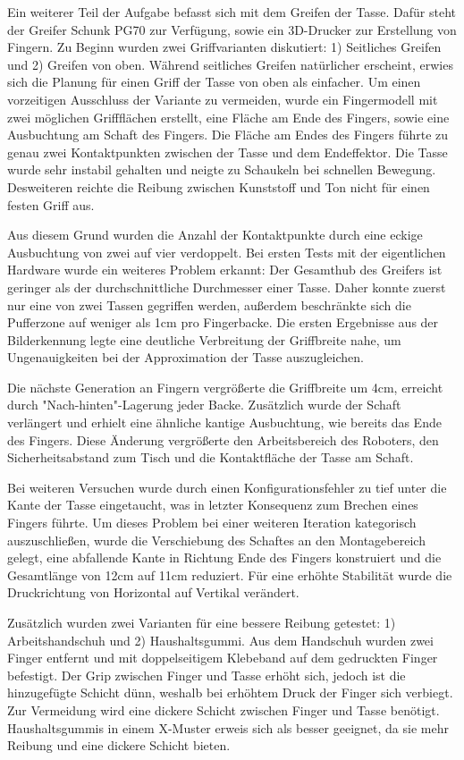 Ein weiterer Teil der Aufgabe befasst sich mit dem Greifen der Tasse. Dafür steht der Greifer Schunk PG70 zur Verfügung, sowie ein 3D-Drucker zur Erstellung von Fingern. Zu Beginn wurden zwei Griffvarianten diskutiert: 1) Seitliches Greifen und 2) Greifen von oben. Während seitliches Greifen natürlicher erscheint, erwies sich die Planung für einen Griff der Tasse von oben als einfacher. Um einen vorzeitigen Ausschluss der Variante zu vermeiden, wurde ein Fingermodell mit zwei möglichen Griffflächen erstellt, eine Fläche am Ende des Fingers, sowie eine Ausbuchtung am Schaft des Fingers. Die Fläche am Endes des Fingers führte zu genau zwei Kontaktpunkten zwischen der Tasse und dem Endeffektor. Die Tasse wurde sehr instabil gehalten und neigte zu Schaukeln bei schnellen Bewegung. Desweiteren reichte die Reibung zwischen Kunststoff und Ton nicht für einen festen Griff aus.

Aus diesem Grund wurden die Anzahl der Kontaktpunkte durch eine eckige Ausbuchtung von zwei auf vier verdoppelt. Bei ersten Tests mit der eigentlichen Hardware wurde ein weiteres Problem erkannt: Der Gesamthub des Greifers ist geringer als der durchschnittliche Durchmesser einer Tasse. Daher konnte zuerst nur eine von zwei Tassen gegriffen werden, außerdem beschränkte sich die Pufferzone auf weniger als 1cm pro Fingerbacke. Die ersten Ergebnisse aus der Bilderkennung legte eine deutliche Verbreitung der Griffbreite nahe, um Ungenauigkeiten bei der Approximation der Tasse auszugleichen.

Die nächste Generation an Fingern vergrößerte die Griffbreite um 4cm, erreicht durch "Nach-hinten"-Lagerung jeder Backe. Zusätzlich wurde der Schaft verlängert und erhielt eine ähnliche kantige Ausbuchtung, wie bereits das Ende des Fingers. Diese Änderung vergrößerte den Arbeitsbereich des Roboters, den Sicherheitsabstand zum Tisch und die Kontaktfläche der Tasse am Schaft.

Bei weiteren Versuchen wurde durch einen Konfigurationsfehler zu tief unter die Kante der Tasse eingetaucht, was in letzter Konsequenz zum Brechen eines Fingers führte. Um dieses Problem bei einer weiteren Iteration kategorisch auszuschließen, wurde die Verschiebung des Schaftes an den Montagebereich gelegt, eine abfallende Kante in Richtung Ende des Fingers konstruiert und die Gesamtlänge von 12cm auf 11cm reduziert. Für eine erhöhte Stabilität wurde die Druckrichtung von Horizontal auf Vertikal verändert.

Zusätzlich wurden zwei Varianten für eine bessere Reibung getestet: 1) Arbeitshandschuh und 2) Haushaltsgummi. Aus dem Handschuh wurden zwei Finger entfernt und mit doppelseitigem Klebeband auf dem gedruckten Finger befestigt. Der Grip zwischen Finger und Tasse erhöht sich, jedoch ist die hinzugefügte Schicht dünn, weshalb bei erhöhtem Druck der Finger sich verbiegt. Zur Vermeidung wird eine dickere Schicht zwischen Finger und Tasse benötigt. Haushaltsgummis in einem X-Muster erweis sich als besser geeignet, da sie mehr Reibung und eine dickere Schicht bieten.

